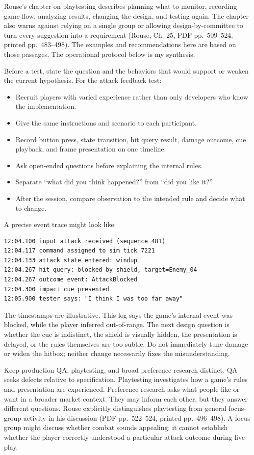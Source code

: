 Rouse's chapter on playtesting describes planning what to monitor, recording game flow, analyzing results, changing the design, and testing again. The chapter also warns against relying on a single group or allowing design-by-committee to turn every suggestion into a requirement (Rouse, Ch. 25, PDF pp.~509--524, printed pp.~483--498). The examples and recommendations here are based on those passages. The operational protocol below is my synthesis.

Before a test, state the question and the behaviors that would support or weaken the current hypothesis. For the attack feedback test:

\begin{itemize}
\tightlist
\item
  Recruit players with varied experience rather than only developers who know the implementation.
\item
  Give the same instructions and scenario to each participant.
\item
  Record button press, state transition, hit query result, damage outcome, cue playback, and frame presentation on one timeline.
\item
  Ask open-ended questions before explaining the internal rules.
\item
  Separate ``what did you think happened?'' from ``did you like it?''
\item
  After the session, compare observation to the intended rule and decide what to change.
\end{itemize}

A precise event trace might look like:

\begin{verbatim}
12:04.100 input attack received (sequence 481)
12:04.117 command assigned to sim tick 7221
12:04.133 attack state entered: windup
12:04.267 hit query: blocked by shield, target=Enemy_04
12:04.267 outcome event: AttackBlocked
12:04.300 impact cue presented
12:05.900 tester says: "I think I was too far away"
\end{verbatim}

The timestamps are illustrative. This log says the game's internal event was blocked, while the player inferred out-of-range. The next design question is whether the cue is indistinct, the shield is visually hidden, the presentation is delayed, or the rules themselves are too subtle. Do not immediately tune damage or widen the hitbox; neither change necessarily fixes the misunderstanding.

Keep production QA, playtesting, and broad preference research distinct. QA seeks defects relative to specification. Playtesting investigates how a game's rules and presentation are experienced. Preference research asks what people like or want in a broader market context. They may inform each other, but they answer different questions. Rouse explicitly distinguishes playtesting from general focus-group activity in his discussion (PDF pp.~522--524, printed pp.~496--498). A focus group might discuss whether combat sounds appealing; it cannot establish whether the player correctly understood a particular attack outcome during live play.

